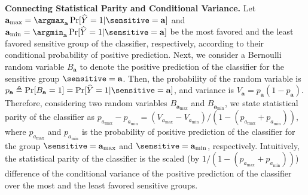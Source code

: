 

\textbf{Connecting Statistical Parity and Conditional Variance.} Let $ \mathbf{a}_{\max} = \argmax_{\mathbf{a}} \Pr[\widehat{Y} = 1 |  \sensitive = \mathbf{a}] $ and $ \mathbf{a}_{\min} = \argmin_{\mathbf{a}} \Pr[\widehat{Y} = 1 | \sensitive = \mathbf{a}] $ be the most favored and the least favored sensitive group of the classifier, respectively, according to their conditional probability of positive prediction. Next, we consider a Bernoulli random variable $ B_{\mathbf{a}} $ to denote the positive prediction of the classifier for the sensitive group $ \sensitive = \mathbf{a} $. Then, the probability of the random variable is $ p_\mathbf{a} \triangleq \Pr[B_{\mathbf{a}} = 1] = \Pr[\widehat{Y} = 1| \sensitive = \mathbf{a}] $, and variance is $ V_{\mathbf{a}} = p_{\mathbf{a}}(1-p_{\mathbf{a}}) $. Therefore, considering two random variables $ B_{\mathbf{a}_{\max}} $ and $ B_{\mathbf{a}_{\min}} $, we state statistical parity of the classifier as $ p_{a_{\max}} - p_{a_{\min}} = (V_{a_{\max}} - V_{a_{\min}})/(1  - (p_{a_{\max}} + p_{a_{\min}})) $, where $ p_{a_{\max}} $ and $ p_{a_{\min}} $ is the probability of positive prediction of the classifier for the group $ \sensitive = \mathbf{a}_{\max} $ and $ \sensitive = \mathbf{a}_{\min} $, respectively. Intuitively, the statistical parity of the classifier is the scaled (by $ 1/(1  - (p_{a_{\max}} + p_{a_{\min}})) $) difference of the conditional variance of the positive prediction of the classifier over the most and the least favored sensitive groups.


